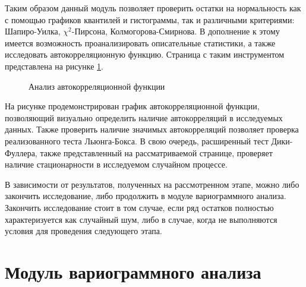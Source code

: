 Таким образом данный модуль позволяет проверить остатки на нормальность как с помощью графиков квантилей и гистограммы, так и различными критериями: Шапиро-Уилка, $ \chi^2 $-Пирсона, Колмогорова-Смирнова. В дополнение к этому имеется возможность проанализировать описательные статистики, а также исследовать автокорреляционную функцию. Страница с таким инструментом представлена на рисунке \ref{img:mod_acf}.
\begin{figure}[ht]
\caption{Анализ автокорреляционной функции}
\label{img:mod_acf}
\end{figure}
На рисунке продемонстрирован график автокорреляционной функции, позволяющий визуально определить наличие автокорреляций в исследуемых данных. Также проверить наличие значимых автокорреляций позволяет проверка реализованного теста Льюнга-Бокса. В свою очередь, расширенный тест Дики-Фуллера, также представленный на рассматриваемой странице, проверяет наличие стационарности в исследуемом случайном процессе.

В зависимости от результатов, полученных на рассмотренном этапе, можно либо закончить исследование, либо продолжить в модуле вариограммного анализа. Закончить исследование стоит в том случае, если ряд остатков полностью характеризуется как случайный шум, либо в случае, когда не выполняются условия для проведения следующего этапа.


\section{Модуль вариограммного анализа} %
\label{sec:mod_variogram}

